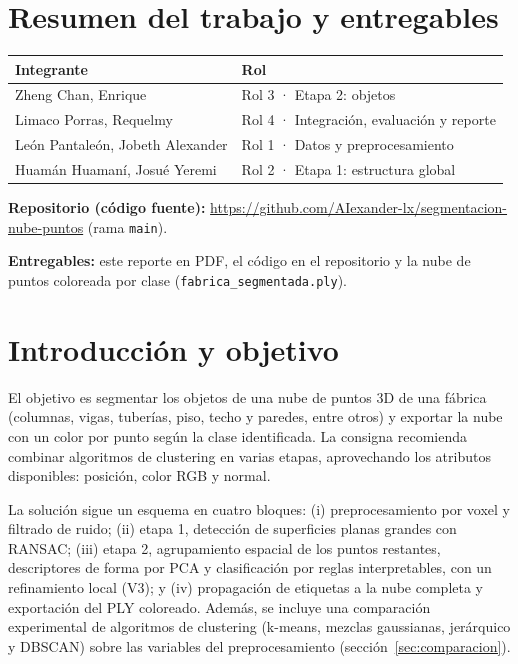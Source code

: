 \documentclass[11pt,a4paper]{article}
\begin{document}
\section*{Resumen del trabajo y entregables}
\begin{tabular}{@{}p{6.2cm}p{8.8cm}@{}}
\toprule
\textbf{Integrante} & \textbf{Rol} \\
\midrule
Zheng Chan, Enrique & Rol 3 · Etapa 2: objetos \\
Limaco Porras, Requelmy & Rol 4 · Integración, evaluación y reporte \\
León Pantaleón, Jobeth Alexander & Rol 1 · Datos y preprocesamiento \\
Huamán Huamaní, Josué Yeremi & Rol 2 · Etapa 1: estructura global \\
\bottomrule
\end{tabular}

\medskip
\noindent\textbf{Repositorio (código fuente):} \url{https://github.com/AIexander-lx/segmentacion-nube-puntos} (rama \texttt{main}).

\noindent\textbf{Entregables:} este reporte en PDF, el código en el repositorio y la nube de puntos coloreada por clase (\texttt{fabrica\_segmentada.ply}).

\tableofcontents
\newpage

\section{Introducción y objetivo}
El objetivo es segmentar los objetos de una nube de puntos 3D de una fábrica (columnas, vigas, tuberías, piso, techo y paredes, entre otros) y exportar la nube con un color por punto según la clase identificada. La consigna recomienda combinar algoritmos de clustering en varias etapas, aprovechando los atributos disponibles: posición, color RGB y normal.

La solución sigue un esquema en cuatro bloques: (i) preprocesamiento por voxel y filtrado de ruido; (ii) etapa 1, detección de superficies planas grandes con RANSAC; (iii) etapa 2, agrupamiento espacial de los puntos restantes, descriptores de forma por PCA y clasificación por reglas interpretables, con un refinamiento local (V3); y (iv) propagación de etiquetas a la nube completa y exportación del PLY coloreado. Además, se incluye una comparación experimental de algoritmos de clustering (k-means, mezclas gaussianas, jerárquico y DBSCAN) sobre las variables del preprocesamiento (sección~\ref{sec:comparacion}).
\end{document}
